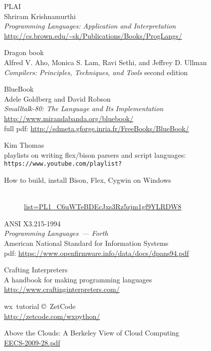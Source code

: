 \begin{thebibliography}{99}

 PLAI\\
Shriram Krishnamurthi\\
\emph{Programming Languages: Application and Interpretation}\\
\url{http://cs.brown.edu/~sk/Publications/Books/ProgLangs/}

 Dragon book\\
Alfred V. Aho, Monica S. Lam, Ravi Sethi, and Jeffrey D. Ullman\\
\emph{Compilers: Principles, Techniques, and Tools} second edition

 BlueBook\\
Adele Goldberg and David Robson\\
\emph{Smalltalk-80: The Language and Its Implementation}\\
\url{http://www.mirandabanda.org/bluebook/}\\
full pdf: \url{http://sdmeta.gforge.inria.fr/FreeBooks/BlueBook/}

Kim Thomas\\playlists on writing flex/bison parsers and script languages:\\
\verb|https://www.youtube.com/playlist?|\\
\begin{description}
\item[How to build, install Bison, Flex, Cygwin on Windows]\ \\
\href{https://www.youtube.com/playlist?list=PL1\_C6uWTeBDEcJxs3Rz5zjm1gf9YLRDW8}{list=PL1\_C6uWTeBDEcJxs3Rz5zjm1gf9YLRDW8}
\item[]
\end{description}

 ANSI X3.215-1994\\
\emph{Programming Languages\ --- Forth}\\
American National Standard for Information Systems\\
pdf: \url{https://www.openfirmware.info/data/docs/dpans94.pdf}

 Crafting Interpreters\\
A handbook for making programming languages\\
\url{http://www.craftinginterpreters.com/}

 wx\py\ tutorial \copyright\ ZetCode\\
	\url{http://zetcode.com/wxpython/}

 Above the Clouds: A Berkeley View of Cloud Computing \\
\href{https://www2.eecs.berkeley.edu/Pubs/TechRpts/2009/EECS-2009-28.pdf}{EECS-2009-28.pdf}

\end{thebibliography}
